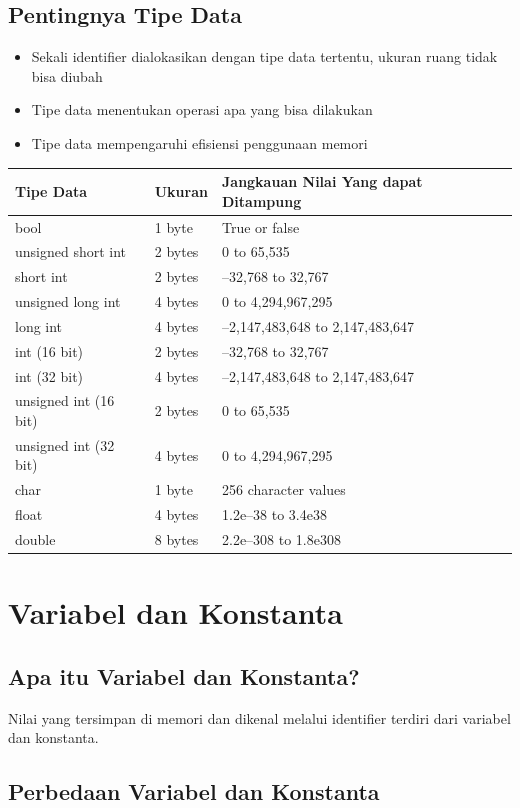 \subsection{Pentingnya Tipe Data}

\begin{itemize}
\item Sekali identifier dialokasikan dengan tipe data tertentu, ukuran ruang tidak bisa diubah
\item Tipe data menentukan operasi apa yang bisa dilakukan
\item Tipe data mempengaruhi efisiensi penggunaan memori
\end{itemize}


\begin{longtable}[]{@{}lll@{}}
\toprule
Tipe Data & Ukuran & Jangkauan Nilai Yang dapat Ditampung\tabularnewline
\midrule
\endhead
bool & 1 byte & True or false\tabularnewline
unsigned short int & 2 bytes & 0 to 65,535\tabularnewline
short int & 2 bytes & --32,768 to 32,767\tabularnewline
unsigned long int & 4 bytes & 0 to 4,294,967,295\tabularnewline
long int & 4 bytes & --2,147,483,648 to 2,147,483,647\tabularnewline
int (16 bit) & 2 bytes & --32,768 to 32,767\tabularnewline
int (32 bit) & 4 bytes & --2,147,483,648 to 2,147,483,647\tabularnewline
unsigned int (16 bit) & 2 bytes & 0 to 65,535\tabularnewline
unsigned int (32 bit) & 4 bytes & 0 to 4,294,967,295\tabularnewline
char & 1 byte & 256 character values\tabularnewline
float & 4 bytes & 1.2e--38 to 3.4e38\tabularnewline
double & 8 bytes & 2.2e--308 to 1.8e308\tabularnewline
\bottomrule

\end{longtable}


\section{Variabel dan Konstanta}\label{variabel-dan-konstanta}

\subsection{Apa itu Variabel dan Konstanta?}

Nilai yang tersimpan di memori dan dikenal melalui identifier terdiri dari variabel dan konstanta.

\subsection{Perbedaan Variabel dan Konstanta}

